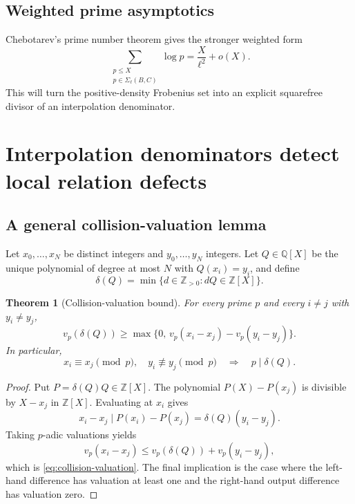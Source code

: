\documentclass[11pt]{article}
\newtheorem{theorem}{Theorem}[section]
\theoremstyle{definition}
\newcommand{\Z}{\mathbb Z}
\newcommand{\Q}{\mathbb Q}
\begin{document}
\subsection{Weighted prime asymptotics}

Chebotarev's prime number theorem gives the stronger weighted form
\begin{equation}
 \sum_{\substack{p\le X\\p\in\Sigma_\ell(B,C)}}\log p
 =\frac{X}{\ell^2}+o(X).
 \label{eq:chebotarev-theta}
\end{equation}
This will turn the positive-density Frobenius set into an explicit squarefree divisor of an
interpolation denominator.

\section{Interpolation denominators detect local relation defects}
\label{sec:denominators}

\subsection{A general collision-valuation lemma}

Let $x_0,\ldots,x_N$ be distinct integers and $y_0,\ldots,y_N$ integers.  Let
$Q\in\Q[X]$ be the unique polynomial of degree at most $N$ with $Q(x_i)=y_i$, and define
\begin{equation}
 \delta(Q)=\min\{d\in\Z_{>0}:dQ\in\Z[X]\}.
 \label{eq:min-denom}
\end{equation}

\begin{theorem}[Collision-valuation bound]
\label{thm:collision-valuation}
For every prime $p$ and every $i\ne j$ with $y_i\ne y_j$,
\begin{equation}
 v_p(\delta(Q))
 \ge
 \max\{0,\,v_p(x_i-x_j)-v_p(y_i-y_j)\}.
 \label{eq:collision-valuation}
\end{equation}
In particular,
\begin{equation}
 x_i\equiv x_j\pmod p,
 \quad y_i\not\equiv y_j\pmod p
 \quad\Longrightarrow\quad
 p\mid\delta(Q).
 \label{eq:collision-prime}
\end{equation}
\end{theorem}

\begin{proof}
Put $P=\delta(Q)Q\in\Z[X]$.  The polynomial $P(X)-P(x_j)$ is divisible by $X-x_j$ in
$\Z[X]$.  Evaluating at $x_i$ gives
\[
 x_i-x_j\mid P(x_i)-P(x_j)
 =\delta(Q)(y_i-y_j).
\]
Taking $p$-adic valuations yields
\[
 v_p(x_i-x_j)
 \le v_p(\delta(Q))+v_p(y_i-y_j),
\]
which is \eqref{eq:collision-valuation}.  The final implication is the case where the
left-hand difference has valuation at least one and the right-hand output difference has
valuation zero.
\end{proof}
\end{document}
